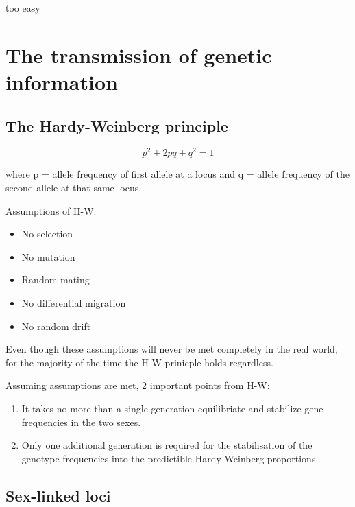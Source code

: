 \documentclass[
]{book}
\providecommand{\tightlist}{%
  \setlength{\itemsep}{0pt}\setlength{\parskip}{0pt}}
\begin{document}
too easy

\hypertarget{the-transmission-of-genetic-information}{%
\section{The transmission of genetic information}\label{the-transmission-of-genetic-information}}

\hypertarget{the-hardy-weinberg-principle}{%
\subsection{The Hardy-Weinberg principle}\label{the-hardy-weinberg-principle}}

\[p^2 + 2pq + q^2 = 1\]

where p = allele frequency of first allele at a locus and q = allele frequency of the second allele at that same locus.

Assumptions of H-W:

\begin{itemize}
\tightlist
\item
  No selection
\item
  No mutation
\item
  Random mating
\item
  No differential migration
\item
  No random drift
\end{itemize}

Even though these assumptions will never be met completely in the real world, for the majority of the time the H-W prinicple holds regardless.

Assuming assumptions are met, 2 important points from H-W:

\begin{enumerate}
\def\labelenumi{\arabic{enumi}.}
\tightlist
\item
  It takes no more than a single generation equilibriate and stabilize gene frequencies in the two sexes.
\item
  Only one additional generation is required for the stabilisation of the genotype frequencies into the predictible Hardy-Weinberg proportions.
\end{enumerate}

\hypertarget{sex-linked-loci}{%
\subsection{Sex-linked loci}\label{sex-linked-loci}}
\end{document}
